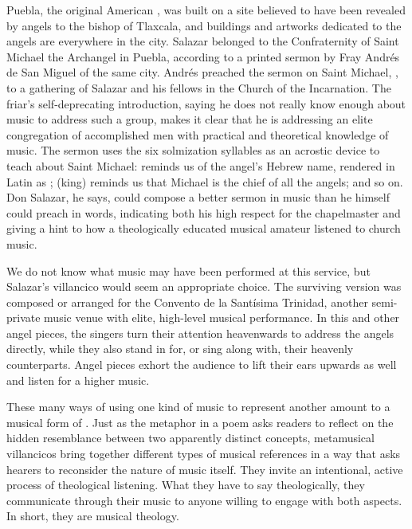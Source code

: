 Puebla, the original American , was built on a site
believed to have been revealed by angels to the bishop of Tlaxcala, and
buildings and artworks dedicated to the angels are everywhere in the city.%
    \Autocites
    {AngelContreras:Puebla}
    {Garcia-Castellanos:Puebla-Utopia}
    {Davies:HarmonyConversion}
Salazar belonged to the Confraternity of Saint Michael the Archangel in Puebla,
according to a printed sermon by Fray Andrés de San Miguel of the same city.
Andrés preached the sermon on Saint Michael, , to a gathering of Salazar and his fellows in the Church
of the Incarnation.%
    \Autocite[65--95]{SanMiguel:Sermones} %
The friar's self-deprecating introduction, saying he does not really know enough
about music to address such a group, makes it clear that he is addressing an
elite congregation of accomplished men with practical and theoretical knowledge
of music.
The sermon uses the six solmization syllables as an acrostic device to
teach about Saint Michael:  reminds us of the angel's Hebrew name,
rendered in Latin as ;  (king) reminds us that
Michael is the chief of all the angels; and so on.
Don Salazar, he says, could compose a better sermon in music than he himself
could preach in words, indicating both his high respect for the chapelmaster
and giving a hint to how a theologically educated musical amateur listened to
church music.


We do not know what music may have been performed at this service, but
Salazar's villancico  would seem an appropriate choice.
The surviving version was composed or arranged for the Convento de la Santísima
Trinidad, another semi-private music venue with elite, high-level musical
performance.
In this and other angel pieces, the singers turn their attention heavenwards to
address the angels directly, while they also stand in for, or sing along
with, their heavenly counterparts.
Angel pieces exhort the audience to lift their ears upwards as well and listen
for a higher music.

These many ways of using one kind of music to represent another amount to a
musical form of .
Just as the metaphor in a  poem asks readers to reflect
on the hidden resemblance between two apparently distinct concepts, metamusical
villancicos bring together different types of musical references in a way that
asks hearers to reconsider the nature of music itself.
They invite an intentional, active process of theological listening.
What they have to say theologically, they communicate through their music to
anyone willing to engage with both aspects.
In short, they are musical theology.

